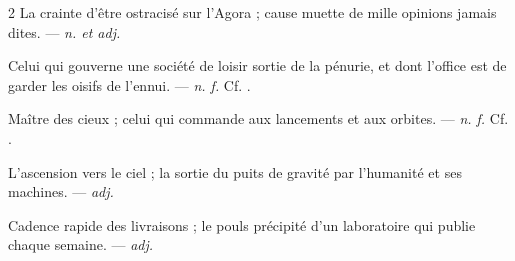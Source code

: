 \begin{multicols}{2}
 La crainte d'être ostracisé sur l'Agora ; cause muette de mille opinions jamais dites. —  \textit{n. et adj.}

 Celui qui gouverne une société de loisir sortie de la pénurie, et dont l'office est de garder les oisifs de l'ennui. —  \textit{n. f.} Cf. .

 Maître des cieux ; celui qui commande aux lancements et aux orbites. —  \textit{n. f.} Cf. .

 L'ascension vers le ciel ; la sortie du puits de gravité par l'humanité et ses machines. —  \textit{adj.}

 Cadence rapide des livraisons ; le pouls précipité d'un laboratoire qui publie chaque semaine. —  \textit{adj.}

\end{multicols}


